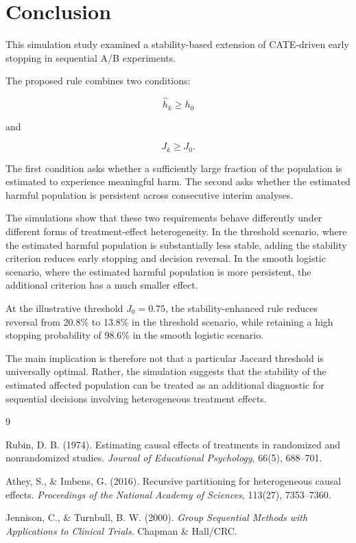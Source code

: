 \documentclass[11pt,a4paper]{article}
\begin{document}
\section{Conclusion}

This simulation study examined a stability-based extension of CATE-driven
early stopping in sequential A/B experiments.

The proposed rule combines two conditions:

\begin{equation}
\widehat h_k\geq h_0
\end{equation}

and

\begin{equation}
J_k\geq J_0.
\end{equation}

The first condition asks whether a sufficiently large fraction of the
population is estimated to experience meaningful harm. The second asks
whether the estimated harmful population is persistent across consecutive
interim analyses.

The simulations show that these two requirements behave differently under
different forms of treatment-effect heterogeneity. In the threshold scenario,
where the estimated harmful population is substantially less stable, adding
the stability criterion reduces early stopping and decision reversal. In the
smooth logistic scenario, where the estimated harmful population is more
persistent, the additional criterion has a much smaller effect.

At the illustrative threshold $J_0 = 0.75$, the stability-enhanced rule reduces
reversal from 20.8\% to 13.8\% in the threshold scenario, while retaining a high
stopping probability of 98.6\% in the smooth logistic scenario.

The main implication is therefore not that a particular Jaccard threshold is
universally optimal. Rather, the simulation suggests that the stability of
the estimated affected population can be treated as an additional diagnostic
for sequential decisions involving heterogeneous treatment effects.


\begin{thebibliography}{9}

Rubin, D. B. (1974).
Estimating causal effects of treatments in randomized and nonrandomized
studies.
\textit{Journal of Educational Psychology}, 66(5), 688--701.

Athey, S., \& Imbens, G. (2016).
Recursive partitioning for heterogeneous causal effects.
\textit{Proceedings of the National Academy of Sciences},
113(27), 7353--7360.

Jennison, C., \& Turnbull, B. W. (2000).
\textit{Group Sequential Methods with Applications to Clinical Trials}.
Chapman \& Hall/CRC.

\end{thebibliography}
\end{document}
